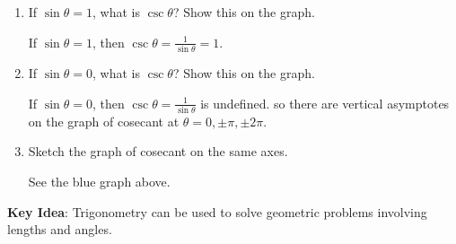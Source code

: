 \documentclass[main]{subfiles}
\begin{document}
\begin{enumerate}[resume]
\begin{enumerate}
    \item
    \begin{problem}
        If $\sin\theta=1$, what is $\csc\theta$? Show this on the graph.
    \end{problem}

    \begin{solution}
        If $\sin\theta=1$, then $\csc\theta=\frac{1}{\sin\theta}=1$.
    \end{solution}

    \item
    \begin{problem}
        If $\sin\theta=0$, what is $\csc\theta$? Show this on the graph.
    \end{problem}

    \begin{solution}
        If $\sin\theta=0$, then $\csc\theta=\frac{1}{\sin\theta}$ is undefined. so there are vertical asymptotes on the graph of cosecant at $\theta = 0, \pm \pi, \pm
      2\pi$. 
    \end{solution}

    \item
    \begin{problem}
        Sketch the graph of cosecant on the same axes.
    \end{problem}

    \begin{solution}
        See the blue graph above.
    \end{solution}
\end{enumerate}

  \end{enumerate}

\pspace{\newpage}



\textbf{Key Idea}: Trigonometry can be used to solve geometric problems involving lengths and angles.
\end{document}

